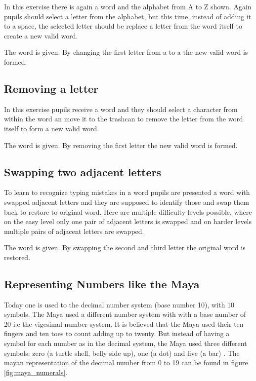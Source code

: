 In this exercise there is again a word and the alphabet from A to Z shown. Again pupils should select a letter from the alphabet, but this time, instead of adding it to a space, the selected letter should be replace a letter from the word itself to create a new valid word.

\begin{example}
    The word  is given. By changing the first letter from a  to a  the new valid word  is formed.
\end{example}

\subsection*{Removing a letter}

In this exercise pupils receive a word and they should select a character from within the word an move it to the trashcan to remove the letter from the word itself to form a new valid word.

\begin{example}
    The word  is given. By removing the first letter the new valid word  is formed.
\end{example}

\subsection*{Swapping two adjacent letters}

To learn to recognize typing mistakes in a word pupils are presented a word with swapped adjacent letters and they are supposed to identify those and swap them back to restore to original word. Here are multiple difficulty levels possible, where on the easy level only one pair of adjacent letters is swapped and on harder levels multiple pairs of adjacent letters are swapped.

\begin{example}
    The word  is given. By swapping the second and third letter the original word  is restored.
\end{example}

\subsection{Representing Numbers like the Maya}

Today one is used to the decimal number system (base number 10), with 10 symbols. The Maya used a different number system with with a base number of 20 i.e the vigesimal number system. It is believed that the Maya used their ten fingers and ten toes to count adding up to twenty. But instead of having a symbol for each number as in the decimal system, the Maya used three different symbols: zero (a turtle shell, belly side up), one (a dot) and five (a bar) \cite{Maya}. The mayan representation of the decimal number from 0 to 19 can be found in figure \ref{fig:maya_numerals}.

